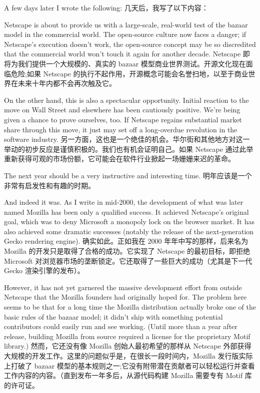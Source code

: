 \documentclass[a4paper,12pt,UTF8,twoside]{ctexbook}
\begin{document}
A few days later I wrote the following:
几天后，我写了以下内容：

Netscape is about to provide us with a large-scale, real-world test of the bazaar model in the commercial world. The open-source culture now faces a danger; if Netscape's execution doesn't work, the open-source concept may be so discredited that the commercial world won't touch it again for another decade.
Netscape 即将为我们提供一个大规模的、真实的 bazaar 模型商业世界测试。开源文化现在面临危险;如果 Netscape 的执行不起作用，开源概念可能会名誉扫地，以至于商业世界在未来十年内都不会再次触及它。

On the other hand, this is also a spectacular opportunity. Initial reaction to the move on Wall Street and elsewhere has been cautiously positive. We're being given a chance to prove ourselves, too. If Netscape regains substantial market share through this move, it just may set off a long-overdue revolution in the software industry.
另一方面，这也是一个绝佳的机会。华尔街和其他地方对这一举动的初步反应是谨慎积极的。我们也有机会证明自己。如果 Netscape 通过此举重新获得可观的市场份额，它可能会在软件行业掀起一场姗姗来迟的革命。

The next year should be a very instructive and interesting time.
明年应该是一个非常有启发性和有趣的时期。

And indeed it was. As I write in mid-2000, the development of what was later named Mozilla has been only a qualified success. It achieved Netscape's original goal, which was to deny Microsoft a monopoly lock on the browser market. It has also achieved some dramatic successes (notably the release of the next-generation Gecko rendering engine).
确实如此。正如我在 2000 年年中写的那样，后来名为 Mozilla 的开发只是取得了合格的成功。它实现了 Netscape 的最初目标，即拒绝 Microsoft 对浏览器市场的垄断锁定。它还取得了一些巨大的成功（尤其是下一代 Gecko 渲染引擎的发布）。

However, it has not yet garnered the massive development effort from outside Netscape that the Mozilla founders had originally hoped for. The problem here seems to be that for a long time the Mozilla distribution actually broke one of the basic rules of the bazaar model; it didn't ship with something potential contributors could easily run and see working. (Until more than a year after release, building Mozilla from source required a license for the proprietary Motif library.)
然而，它还没有像 Mozilla 创始人最初希望的那样从 Netscape 外部获得大规模的开发工作。这里的问题似乎是，在很长一段时间内，Mozilla 发行版实际上打破了 bazaar 模型的基本规则之一;它没有附带潜在贡献者可以轻松运行并查看工作内容的内容。（直到发布一年多后，从源代码构建 Mozilla 需要专有 Motif 库的许可证。
\end{document}
